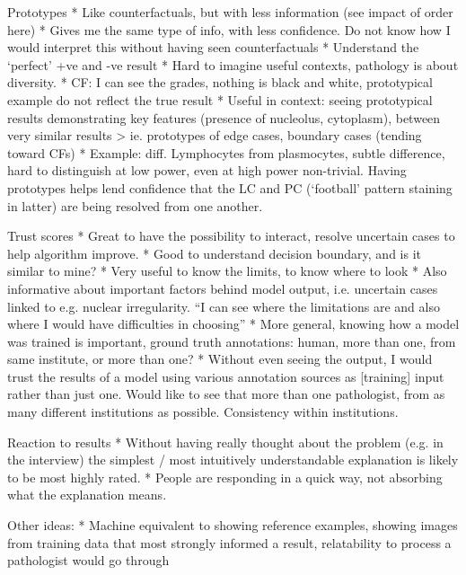 Prototypes
* Like counterfactuals, but with less information (see impact of order here)
* Gives me the same type of info, with less confidence. Do not know how I would interpret this without having seen counterfactuals
* Understand the ‘perfect’ +ve and -ve result
* Hard to imagine useful contexts, pathology is about diversity.
* CF: I can see the grades, nothing is black and white, prototypical example do not reflect the true result
* Useful in context: seeing prototypical results demonstrating key features (presence of nucleolus, cytoplasm), between very similar results > ie. prototypes of edge cases, boundary cases (tending toward CFs)
* Example: diff. Lymphocytes from plasmocytes, subtle difference, hard to distinguish at low power, even at high power non-trivial. Having prototypes helps lend confidence that the LC and PC (‘football’ pattern staining in latter) are being resolved from one another.

Trust scores
* Great to have the possibility to interact, resolve uncertain cases to help algorithm improve.
* Good to understand decision boundary, and is it similar to mine?
* Very useful to know the limits, to know where to look
* Also informative about important factors behind model output, i.e. uncertain cases linked to e.g. nuclear irregularity. “I can see where the limitations are and also where I would have difficulties in choosing”
* More general, knowing how a model was trained is important, ground truth annotations: human, more than one, from same institute, or more than one? 
* Without even seeing the output, I would trust the results of a model using various annotation sources as [training] input rather than just one. Would like to see that more than one pathologist, from as many different institutions as possible. Consistency within institutions.

Reaction to results
* Without having really thought about the problem (e.g. in the interview) the simplest / most intuitively understandable explanation is likely to be most highly rated.
* People are responding in a quick way, not absorbing what the explanation means.

Other ideas:
* Machine equivalent to showing reference examples, showing images from training data that most strongly informed a result, relatability to process a pathologist would go through